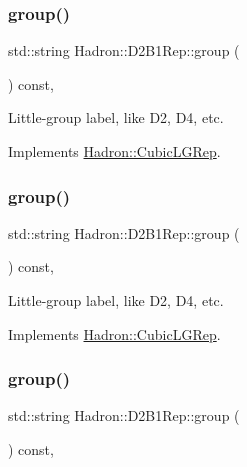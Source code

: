 \subsubsection{\texorpdfstring{group()}{group()}\hspace{0.1cm}{\footnotesize\ttfamily [3/5]}}
{\footnotesize\ttfamily std\+::string Hadron\+::\+D2\+B1\+Rep\+::group (\begin{DoxyParamCaption}{ }\end{DoxyParamCaption}) const\hspace{0.3cm}{\ttfamily [inline]}, {\ttfamily [virtual]}}

Little-\/group label, like D2, D4, etc. 

Implements \mbox{\hyperlink{structHadron_1_1CubicLGRep_a9bdb14b519a611d21379ed96a3a9eb41}{Hadron\+::\+Cubic\+L\+G\+Rep}}.

\mbox{\label{structHadron_1_1D2B1Rep_aa089e3f39579397519c844b305a926b9}} 
\subsubsection{\texorpdfstring{group()}{group()}\hspace{0.1cm}{\footnotesize\ttfamily [4/5]}}
{\footnotesize\ttfamily std\+::string Hadron\+::\+D2\+B1\+Rep\+::group (\begin{DoxyParamCaption}{ }\end{DoxyParamCaption}) const\hspace{0.3cm}{\ttfamily [inline]}, {\ttfamily [virtual]}}

Little-\/group label, like D2, D4, etc. 

Implements \mbox{\hyperlink{structHadron_1_1CubicLGRep_a9bdb14b519a611d21379ed96a3a9eb41}{Hadron\+::\+Cubic\+L\+G\+Rep}}.

\mbox{\label{structHadron_1_1D2B1Rep_aa089e3f39579397519c844b305a926b9}} 
\subsubsection{\texorpdfstring{group()}{group()}\hspace{0.1cm}{\footnotesize\ttfamily [5/5]}}
{\footnotesize\ttfamily std\+::string Hadron\+::\+D2\+B1\+Rep\+::group (\begin{DoxyParamCaption}{ }\end{DoxyParamCaption}) const\hspace{0.3cm}{\ttfamily [inline]}, {\ttfamily [virtual]}}

